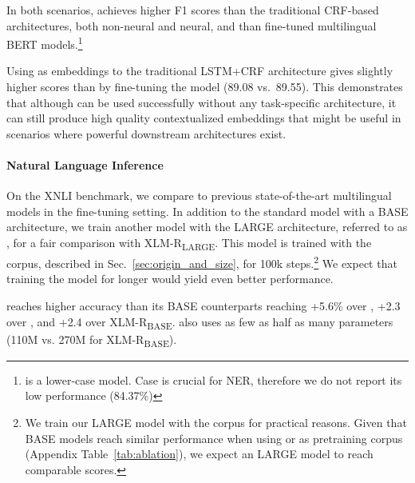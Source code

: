 In both scenarios, \camembert achieves higher F1 scores than the traditional CRF-based architectures, both non-neural and neural, and than fine-tuned multilingual BERT models.\footnote{\xlmmlmtlm is a lower-case model. Case is crucial for NER, therefore we do not report its low performance (84.37\%)}

Using \camembert as embeddings to the traditional LSTM+CRF architecture gives slightly higher scores than by fine-tuning the model (89.08 vs.~89.55).
This demonstrates that although \camembert can be used successfully without any task-specific architecture, it can still produce high quality contextualized embeddings that might be useful in scenarios where powerful downstream architectures exist.




\paragraph{Natural Language Inference}
On the XNLI benchmark, we compare \camembert to previous state-of-the-art multilingual models in the fine-tuning setting. In addition to the standard \camembert model with a BASE architecture, we train another model with the LARGE architecture, referred to as \camembertccnetlarge, for a fair comparison with XLM-R\textsubscript{LARGE}.
This model is trained with the \ccnet corpus, described in Sec.~\ref{sec:origin_and_size}, for 100k steps.\footnote{We train our LARGE model with the \ccnet corpus for practical reasons. Given that BASE models reach similar performance when using \oscar or \ccnet as pretraining corpus (Appendix Table~\ref{tab:ablation}), we expect an \oscar LARGE model to reach comparable scores.} We expect that training the model for longer would yield even better performance.

\camembert reaches higher accuracy than its BASE counterparts reaching +5.6\% over \mbert, +2.3 over \xlmmlmtlm, and +2.4 over XLM-R\textsubscript{BASE}. \camembert also uses as few as half as many parameters (110M vs. 270M for XLM-R\textsubscript{BASE}).

